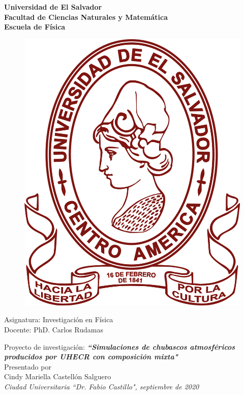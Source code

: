 \begin{titlepage}
	\begin{center}
	\LARGE
	\textbf{Universidad de El Salvador \\ 
	Facultad de Ciencias Naturales y Matemática  \\
	Escuela de Física}
	\end{center}
	
	\vspace{0.5cm}

	\begin{figure}[h]
	\centering
	\includegraphics[scale=0.12]{ues_logo.png}
	\end{figure}

	\vspace{0.5cm}
	
	\begin{center}
	\large	
	Asignatura: Investigación en Física \\
	Docente: PhD. Carlos Rudamas \\
	\vspace{1.0cm}
	
	\LARGE
	Proyecto de investigación: \textit{\textbf{``Simulaciones de chubascos atmosféricos producidos por UHECR con composición mixta"}}\\
	
	\vspace{1.0cm}
	\large
	Presentado por\\
	Cindy Mariella Castellón Salguero\\
	\vspace{5.0cm}
	\textit{Ciudad Universitaria ``Dr. Fabio Castillo", septiembre de 2020}
	\end{center}
\end{titlepage}
